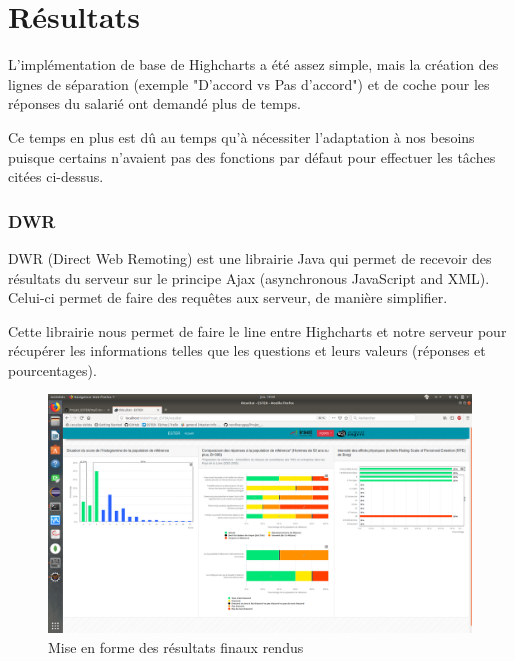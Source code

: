 \section{Résultats}

L'implémentation de base de Highcharts a été assez simple, mais la création des lignes de séparation (exemple "D'accord vs Pas d'accord") et de coche pour les réponses du salarié ont demandé plus de temps. 

Ce temps en plus est dû au temps qu'à nécessiter l'adaptation à nos besoins puisque certains n'avaient pas des fonctions par défaut pour effectuer les tâches citées ci-dessus.

\subsubsection{DWR}

DWR (Direct Web Remoting) est une librairie Java qui permet de recevoir des résultats du serveur sur le principe Ajax (asynchronous JavaScript and XML). Celui-ci permet de faire des requêtes aux serveur, de manière simplifier.

Cette librairie nous permet de faire le line entre Highcharts et notre serveur pour récupérer les informations telles que les questions et leurs valeurs (réponses et pourcentages).

\begin{figure}[H]
    \begin{center}
    \includegraphics[scale=0.2,trim=2.8cm 0.1cm 0.8cm 5.3cm, clip=true]{img/resultat}
    \end{center}
    \caption{Mise en forme des résultats finaux rendus }
\end{figure}